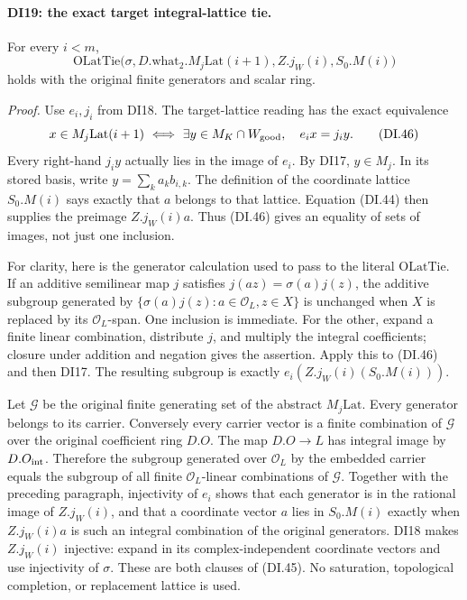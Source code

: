 \paragraph{DI19: the exact target integral-lattice tie.}
\label{claim:DI19}
For every \(i<m\),
\[
 \mathrm{OLatTie}\bigl(\sigma,D.\mathrm{what}_2.M_j\mathrm{Lat}(i+1),
                         Z.j_W(i),S_0.M(i)\bigr)
 \tag{DI.45}
\]
holds with the original finite generators and scalar ring.

\emph{Proof.}
Use \(e_i,j_i\) from DI18. The target-lattice reading has the
exact equivalence
\[
 x\in M_j\mathrm{Lat}(i+1)
 \ \Longleftrightarrow\ 
 \exists y\in M_K\cap W_{\rm good},\quad e_i x=j_i y.
 \tag{DI.46}
\]
Every right-hand \(j_i y\) actually lies in the image of \(e_i\).
By DI17, \(y\in M_j\). In its stored basis, write
\(y=\sum_k a_kb_{i,k}\). The definition of the coordinate lattice
\(S_0.M(i)\) says exactly that \(a\) belongs to that lattice.
Equation (DI.44) then supplies the preimage \(Z.j_W(i)a\).
Thus (DI.46) gives an equality of sets of images, not just one
inclusion.

For clarity, here is the generator calculation used to pass to the
literal \(\mathrm{OLatTie}\). If an additive semilinear map \(j\)
satisfies \(j(az)=\sigma(a)j(z)\), the additive subgroup generated
by \(\{\sigma(a)j(z):a\in\mathcal O_L,z\in X\}\) is unchanged
when \(X\) is replaced by its \(\mathcal O_L\)-span. One inclusion
is immediate. For the other, expand a finite linear combination,
distribute \(j\), and multiply the integral coefficients; closure
under addition and negation gives the assertion. Apply this to
(DI.46) and then DI17. The resulting subgroup is exactly
\(e_i(Z.j_W(i)(S_0.M(i)))\).

Let \(\mathcal G\) be the original finite generating set of the
abstract \(M_j\mathrm{Lat}\). Every generator belongs to its
carrier. Conversely every carrier vector is a finite combination
of \(\mathcal G\) over the original coefficient ring \(D.O\).
The map \(D.O\to L\) has integral image by \(D.O_{\rm int}\).
Therefore the subgroup generated over \(\mathcal O_L\) by the
embedded carrier equals the subgroup of all finite
\(\mathcal O_L\)-linear combinations of \(\mathcal G\).
Together with the preceding paragraph, injectivity of \(e_i\)
shows that each generator is in the rational image of \(Z.j_W(i)\),
and that a coordinate vector \(a\) lies in \(S_0.M(i)\) exactly
when \(Z.j_W(i)a\) is such an integral combination of the original
generators. DI18 makes \(Z.j_W(i)\) injective: expand in its
complex-independent coordinate vectors and use injectivity of
\(\sigma\). These are both clauses of (DI.45). No saturation,
topological completion, or replacement lattice is used.

